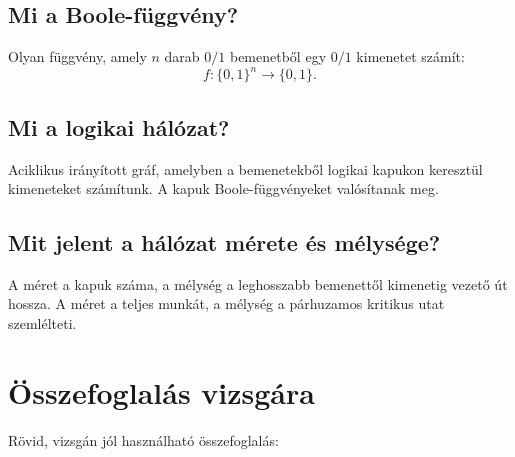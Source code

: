\subsection{Mi a Boole-függvény?}

Olyan függvény, amely $n$ darab $0/1$ bemenetből egy $0/1$ kimenetet számít:
\[
  f:\{0,1\}^n\to\{0,1\}.
\]

\subsection{Mi a logikai hálózat?}

Aciklikus irányított gráf, amelyben a bemenetekből logikai kapukon keresztül kimeneteket számítunk. A kapuk Boole-függvényeket valósítanak meg.

\subsection{Mit jelent a hálózat mérete és mélysége?}

A méret a kapuk száma, a mélység a leghosszabb bemenettől kimenetig vezető út hossza. A méret a teljes munkát, a mélység a párhuzamos kritikus utat szemlélteti.

\section{Összefoglalás vizsgára}

Rövid, vizsgán jól használható összefoglalás:

